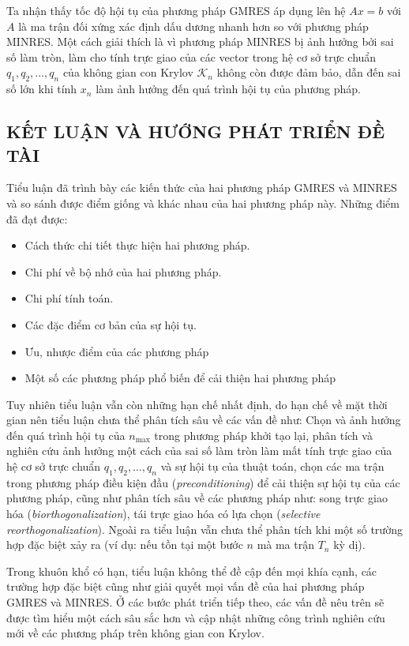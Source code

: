 \documentclass[14pt, a4paper]{article}
\numberwithin{equation}{section}
\numberwithin{algorithm}{section}
\numberwithin{figure}{section}
\numberwithin{dl}{section}
\numberwithin{md}{section}
\numberwithin{bd}{section}
\numberwithin{dn}{section}
\begin{document}
Ta nhận thấy tốc độ hội tụ của phương pháp GMRES áp dụng lên hệ $Ax=b$ với $A$ là ma trận đối xứng xác định dấu dương nhanh hơn so với phương pháp MINRES. Một cách giải thích là vì phương pháp MINRES bị ảnh hưởng bởi sai số làm tròn, làm cho tính trực giao của các vector trong hệ cơ sở trực chuẩn $q_1, q_2, \dots, q_n$ của không gian con Krylov $\mathcal{K}_n$ không còn được đảm bảo, dẫn đến sai số lớn khi tính $x_n$ làm ảnh hưởng đến quá trình hội tụ của phương pháp.


\newpage
\begin{center}
    \section*{KẾT LUẬN VÀ HƯỚNG PHÁT TRIỂN ĐỀ TÀI}
\end{center}

Tiểu luận đã trình bày các kiến thức của hai phương pháp GMRES và MINRES và so sánh được điểm giống và khác nhau của hai phương pháp này.
Những điểm đã đạt được:

\begin{itemize}
    \item Cách thức chi tiết thực hiện hai phương pháp.
    \item Chi phí về bộ nhớ của hai phương pháp.
    \item Chi phí tính toán.
    \item Các đặc điểm cơ bản của sự hội tụ.
    \item Ưu, nhược điểm của các phương pháp
    \item Một số các phương pháp phổ biến để cải thiện hai phương pháp
\end{itemize}

Tuy nhiên tiểu luận vẫn còn những hạn chế nhất định, do hạn chế về mặt thời gian nên tiểu luận chưa thể phân tích sâu về các vấn đề như: Chọn và ảnh hưởng đến quá trình hội tụ của $n_{\max}$ trong phương pháp khởi tạo lại, phân tích và nghiên cứu ảnh hưởng một cách của sai số làm tròn làm mất tính trực giao của hệ cơ sở trực chuẩn $q_1, q_2, \dots, q_n$ và sự hội tụ của thuật toán, chọn các ma trận trong phương pháp điều kiện đầu (\textit{preconditioning}) để cải thiện sự hội tụ của các phương pháp,
cũng như phân tích sâu về các phương pháp như: song trực giao hóa (\textit{biorthogonalization}), tái trực giao hóa có lựa chọn (\textit{selective reorthogonalization}).
Ngoài ra tiểu luận vẫn chưa thể phân tích khi một số trường hợp đặc biệt xảy ra (ví dụ: nếu tồn tại một bước $n$ mà ma trận $T_n$ kỳ dị).

Trong khuôn khổ có hạn, tiểu luận không thể đề cập đến mọi khía cạnh, các trường hợp đặc biệt cũng như giải quyết mọi vấn đề của hai phương pháp GMRES và MINRES. Ở các bước phát triển tiếp theo, các vấn đề nêu trên sẽ được tìm hiểu một cách sâu sắc hơn và cập nhật những công trình nghiên cứu mới về các phương pháp trên không gian con Krylov.
\newpage
{}
%
%
\printbibliography[title={TÀI LIỆU THAM KHẢO}]

\end{document}
